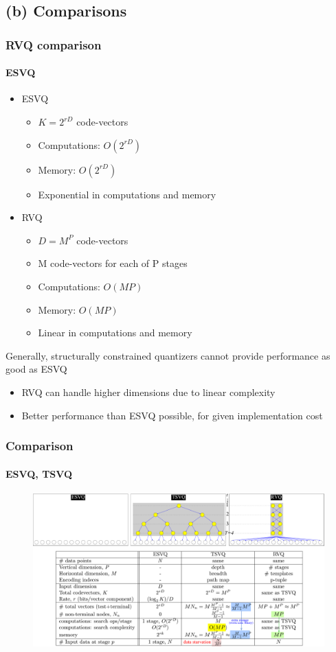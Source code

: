 \subsection{(b) Comparisons}
\begin{frame}
\frametitle{RVQ comparison}\logoCSIPCPL\mypagenum
\framesubtitle{ESVQ}
	\begin{itemize}
		\item ESVQ
			\begin{itemize}
				\item $K=2^{rD}$ code-vectors
				\item Computations: $O(2^{rD})$
				\item Memory: $O(2^{rD})$
				\item Exponential in computations and memory
			\end{itemize}
		\item RVQ
			\begin{itemize}
				\item $D={M^P}$ code-vectors
				\item M code-vectors for each of P stages
				\item Computations: $O(MP)$
				\item Memory: $O(MP)$
				\item Linear in computations and memory
			\end{itemize}
	\end{itemize}
	Generally, structurally constrained quantizers cannot provide performance as good as ESVQ
	\begin{itemize}
		\item RVQ can handle higher dimensions due to linear complexity
		\item Better performance than ESVQ possible, for given implementation cost
	\end{itemize}	
\end{frame}

\begin{frame}[plain]
\frametitle{Comparison}
\framesubtitle{ESVQ, TSVQ}
\logoCSIPCPL\mypagenum
\begin{changemargin}{-1.3in}{0in}
\begin{figure}		
\includegraphics[width=1.3\textwidth]{thesis/RVQ_comparisonWithESVQ_TSVQ_1.pdf}			
\end{figure}
\end{changemargin}
\end{frame}




